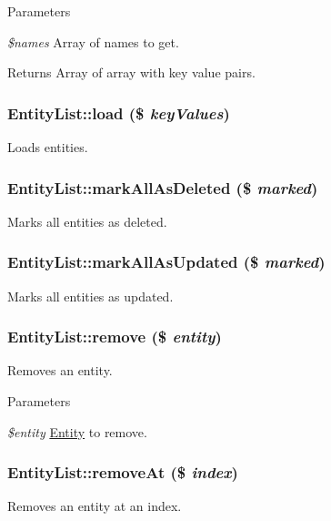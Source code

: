 \begin{DoxyParams}{Parameters}
\item[{\em \$names}]Array of names to get.\end{DoxyParams}
\begin{DoxyReturn}{Returns}
Array of array with key value pairs. 
\end{DoxyReturn}
\hypertarget{classEntityList_ae5f55d5e1df620ba120b6ab4e6cec15d}{
\subsubsection[{load}]{\setlength{\rightskip}{0pt plus 5cm}EntityList::load (\$ {\em keyValues})}}
\label{classEntityList_ae5f55d5e1df620ba120b6ab4e6cec15d}
Loads entities. \hypertarget{classEntityList_a5b2c2e5947b0821fb90e036d7ae98fdb}{
\subsubsection[{markAllAsDeleted}]{\setlength{\rightskip}{0pt plus 5cm}EntityList::markAllAsDeleted (\$ {\em marked})}}
\label{classEntityList_a5b2c2e5947b0821fb90e036d7ae98fdb}
Marks all entities as deleted. \hypertarget{classEntityList_a302b1ec9c4be159736e937ee8ed6a33b}{
\subsubsection[{markAllAsUpdated}]{\setlength{\rightskip}{0pt plus 5cm}EntityList::markAllAsUpdated (\$ {\em marked})}}
\label{classEntityList_a302b1ec9c4be159736e937ee8ed6a33b}
Marks all entities as updated. \hypertarget{classEntityList_a5ec81b26c533af92dcf6af06e6b4e54e}{
\subsubsection[{remove}]{\setlength{\rightskip}{0pt plus 5cm}EntityList::remove (\$ {\em entity})}}
\label{classEntityList_a5ec81b26c533af92dcf6af06e6b4e54e}
Removes an entity.


\begin{DoxyParams}{Parameters}
\item[{\em \$entity}]\hyperlink{classEntity}{Entity} to remove. \end{DoxyParams}
\hypertarget{classEntityList_afa9c310fb513d687dc753fe0f7e31431}{
\subsubsection[{removeAt}]{\setlength{\rightskip}{0pt plus 5cm}EntityList::removeAt (\$ {\em index})}}
\label{classEntityList_afa9c310fb513d687dc753fe0f7e31431}
Removes an entity at an index.


